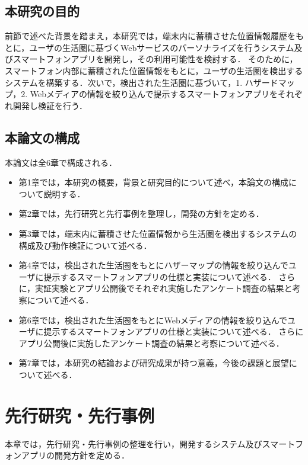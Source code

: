 \documentclass[a4paper]{jsarticle}
\begin{document}
\subsection{本研究の目的}
前節で述べた背景を踏まえ，本研究では，端末内に蓄積させた位置情報履歴をもとに，ユーザの生活圏に基づくWebサービスのパーソナライズを行うシステム及びスマートフォンアプリを開発し，その利用可能性を検討する．
そのために，スマートフォン内部に蓄積された位置情報をもとに，ユーザの生活圏を検出するシステムを構築する．次いで，検出された生活圏に基づいて，1. ハザードマップ，2. Webメディアの情報を絞り込んで提示するスマートフォンアプリをそれぞれ開発し検証を行う．

\subsection{本論文の構成}
本論文は全6章で構成される．
\begin{itemize}
  \item
第1章では，本研究の概要，背景と研究目的について述べ，本論文の構成について説明する．
  \item
第2章では，先行研究と先行事例を整理し，開発の方針を定める．
  \item
第3章では，端末内に蓄積させた位置情報から生活圏を検出するシステムの構成及び動作検証について述べる．
  \item
第4章では，検出された生活圏をもとにハザーマップの情報を絞り込んでユーザに提示するスマートフォンアプリの仕様と実装について述べる．
さらに，実証実験とアプリ公開後でそれぞれ実施したアンケート調査の結果と考察について述べる．
  \item
第6章では，検出された生活圏をもとにWebメディアの情報を絞り込んでユーザに提示するスマートフォンアプリの仕様と実装について述べる．
さらにアプリ公開後に実施したアンケート調査の結果と考察について述べる．
  \item
第7章では，本研究の結論および研究成果が持つ意義，今後の課題と展望について述べる．
\end{itemize}

\section{先行研究・先行事例}
本章では，先行研究・先行事例の整理を行い，開発するシステム及びスマートフォンアプリの開発方針を定める．
\end{document}
